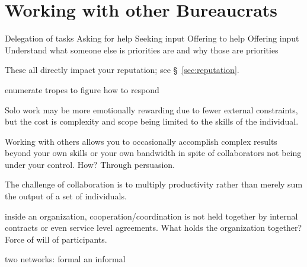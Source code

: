 \section{Working with other Bureaucrats\label{sec:working-with-other-bureaucrats}}

Delegation of tasks
Asking for help
Seeking input
Offering to help
Offering input
Understand what someone else is priorities are and why those are priorities

These all directly impact your reputation; see \S~\ref{sec:reputation}.


enumerate tropes to figure how to respond

Solo work may be more emotionally rewarding due to fewer external constraints, but the cost is complexity and scope being limited to the skills of the individual. 

Working with others allows you to occasionally accomplish complex results beyond your own skills or your own bandwidth in spite of collaborators not being under your control. How? Through persuasion. 

The challenge of collaboration is to multiply productivity rather than merely sum the output of a set of individuals. 

inside an organization, cooperation/coordination is not held together by internal contracts or even service level agreements. What holds the organization together? Force of will of participants. 

two networks: formal an informal